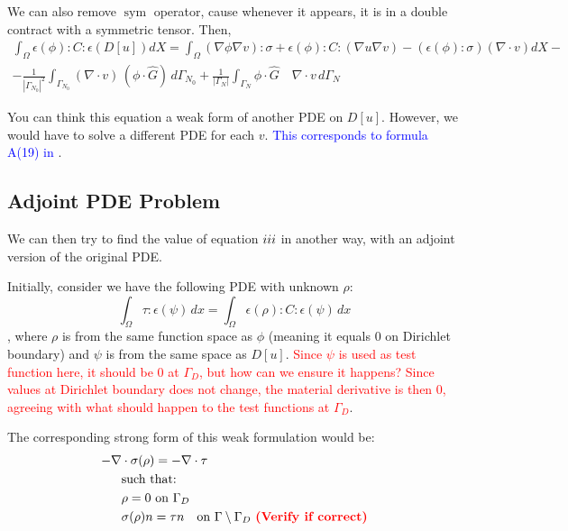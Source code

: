 \documentclass[11pt]{article}
\DeclareMathOperator{\sym}{sym}
\newcommand{\RNum}[1]{\uppercase\expandafter{\romannumeral #1\relax}}
\newcommand{\red}{\textcolor{red}}
\newcommand{\blue}{\textcolor{blue}}
\begin{document}
We can also remove $\sym$ operator, cause whenever it appears, it is in a double contract with a symmetric tensor. Then,
{\small
\begin{multline}
  \boxed{\int_{\Omega} \epsilon(\phi):C:\epsilon(D[u]) dX =
  \int_{\Omega} (\nabla \phi \nabla v):\sigma + \epsilon(\phi):C:(\nabla u \nabla v) - (\epsilon(\phi): \sigma) (\nabla \cdot v)  dX -} \\ \boxed{- \frac{1}{|\Gamma_{N_0}|^2} \int_{\Gamma_{N_0}} (\nabla \cdot v)\, (\phi \cdot \hat G)\, d\Gamma_{N_0} + \frac{1}{|\Gamma_N|} \int_{\Gamma_{N}} \phi \cdot \hat G \quad \nabla \cdot v\, d\Gamma_{N}}
  \label{eq:forwardversion}
\end{multline}
}


You can think this equation a weak form of another PDE on $D[u]$. However, we would have to solve a different PDE for each $v$. \blue{This corresponds to formula A(19) in \cite{panetta2017}}.

\subsection{Adjoint PDE Problem}
We can then try to find the value of equation $\RNum{3}$ in another way, with an adjoint version of the original PDE.

Initially, consider we have the following PDE with unknown $\rho$:
\begin{equation}
  \int_\Omega \tau:\epsilon(\psi)\, dx = \int_\Omega \epsilon(\rho):C:\epsilon(\psi) \, dx 
  \label{eq:adjointproblem}
\end{equation}
, where $\rho$ is from the same function space as $\phi$ (meaning it equals $0$ on Dirichlet boundary) and $\psi$ is from the same space as $D[u]$. \textcolor{red}{Since $\psi$ is used as test function here, it should be $0$ at $\Gamma_D$, but how can we ensure it happens? Since values at Dirichlet boundary does not change, the material derivative is then $0$, agreeing with what should happen to the test functions at $\Gamma_D$}.

The corresponding strong form of this weak formulation would be:
\begin{align*}
  - \nabla & \cdot \sigma(\rho) = - \nabla \cdot \tau \\
  &\text{such that: } \\
  &\rho =  0 \text{ on $\Gamma_D$}\\
  &\sigma(\rho) n = \tau n \quad \text{on $\Gamma \setminus \Gamma_D$  \red{\textbf{(Verify if correct)}}}
\end{align*}
\end{document}
